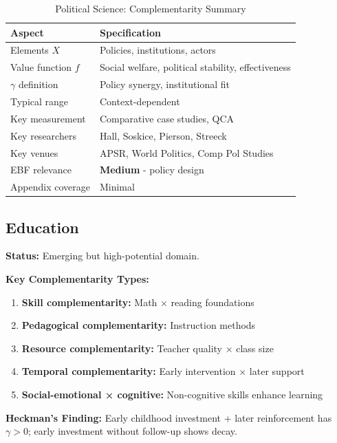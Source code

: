 \begin{table}[h]
\centering
\caption{Political Science: Complementarity Summary}
\label{tab:polsci-summary}
\renewcommand{\arraystretch}{1.3}
\small
\begin{tabular}{@{}ll@{}}
\toprule
\textbf{Aspect} & \textbf{Specification} \\
\midrule
Elements $X$ & Policies, institutions, actors \\
Value function $f$ & Social welfare, political stability, effectiveness \\
$\gamma$ definition & Policy synergy, institutional fit \\
Typical range & Context-dependent \\
Key measurement & Comparative case studies, QCA \\
Key researchers & Hall, Soskice, Pierson, Streeck \\
Key venues & APSR, World Politics, Comp Pol Studies \\
EBF relevance & \textbf{Medium} - policy design \\
Appendix coverage & Minimal \\
\bottomrule
\end{tabular}
\end{table}

\subsection{Education}
\label{sec:edu}

\begin{tcolorbox}[colback=cyan!5!white,colframe=cyan!75!black,title=\textbf{Education: Learning Complementarities}]

\textbf{Status:} Emerging but high-potential domain.

\textbf{Key Complementarity Types:}
\begin{enumerate}[noitemsep]
    \item \textbf{Skill complementarity:} Math × reading foundations
    \item \textbf{Pedagogical complementarity:} Instruction methods
    \item \textbf{Resource complementarity:} Teacher quality × class size
    \item \textbf{Temporal complementarity:} Early intervention × later support
    \item \textbf{Social-emotional × cognitive:} Non-cognitive skills enhance learning
\end{enumerate}

\textbf{Heckman's Finding:}
Early childhood investment + later reinforcement has $\gamma > 0$; early investment without follow-up shows decay.

\end{tcolorbox}

